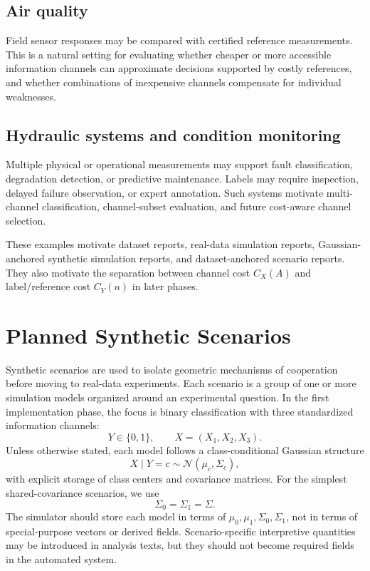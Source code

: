 \documentclass[11pt,a4paper]{article}
\begin{document}
\subsection*{Air quality}
Field sensor responses may be compared with certified reference measurements. This is a natural setting for evaluating whether cheaper or more accessible information channels can approximate decisions supported by costly references, and whether combinations of inexpensive channels compensate for individual weaknesses.

\subsection*{Hydraulic systems and condition monitoring}
Multiple physical or operational measurements may support fault classification, degradation detection, or predictive maintenance. Labels may require inspection, delayed failure observation, or expert annotation. Such systems motivate multi-channel classification, channel-subset evaluation, and future cost-aware channel selection.

These examples motivate dataset reports, real-data simulation reports, Gaussian-anchored synthetic simulation reports, and dataset-anchored scenario reports. They also motivate the separation between channel cost $C_X(A)$ and label/reference cost $C_Y(n)$ in later phases.

\section{Planned Synthetic Scenarios}

Synthetic scenarios are used to isolate geometric mechanisms of cooperation before moving to real-data experiments. Each scenario is a group of one or more simulation models organized around an experimental question. In the first implementation phase, the focus is binary classification with three standardized information channels:
\[
    Y\in\{0,1\},\qquad X=(X_1,X_2,X_3).
\]
Unless otherwise stated, each model follows a class-conditional Gaussian structure
\[
    X\mid Y=c\sim \mathcal{N}(\mu_c,\Sigma_c),
\]
with explicit storage of class centers and covariance matrices. For the simplest shared-covariance scenarios, we use
\[
    \Sigma_0=\Sigma_1=\Sigma.
\]
The simulator should store each model in terms of $\mu_0,\mu_1,\Sigma_0,\Sigma_1$, not in terms of special-purpose vectors or derived fields. Scenario-specific interpretive quantities may be introduced in analysis texts, but they should not become required fields in the automated system.
\end{document}
